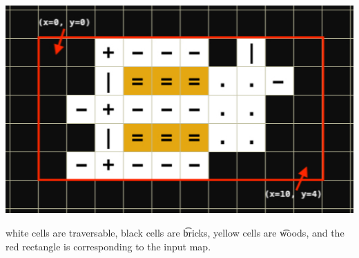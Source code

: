 \begin{center}
  \includegraphics[scale=0.5]{grid.jpg}

  white cells are traversable, black cells are \t{bricks}, yellow cells are \t{woods},
  and the red rectangle is corresponding to the input map.
\end{center}
